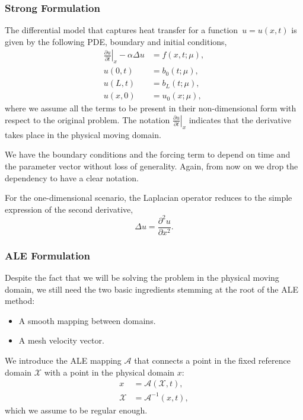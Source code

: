 \documentclass[../../main.tex]{subfiles}
\newcommand{\alemap}{\ensuremath{\mathcal{A}}}
\newcommand{\aleX}{\ensuremath{\mathcal{X}}}
\begin{document}
\subsubsection{Strong Formulation}
The differential model that captures heat transfer for a function~$u = u(x,t)$ is given by the following PDE, boundary and initial conditions,
\begin{subequations}
    \begin{align}
        \left.\frac{\partial u}{\partial t}\right|_{x} - \alpha \Delta u &= f(x, t; \mu), \label{eq:1d_fom_strong_pde}\\
        u(0, t) &= b_0(t; \mu), \\
        u(L, t) &= b_L(t; \mu), \\
        u(x, 0) &= u_0(x; \mu),
    \end{align}
\end{subequations}
where we assume all the terms to be present in their non-dimensional form with respect to the original problem. 
The notation $\left.\frac{\partial u}{\partial t}\right|_{x}$ indicates that the derivative takes place in the physical moving domain. 

We have the boundary conditions and the forcing term to depend on time and the parameter vector without loss of generality.
Again, from now on we drop the dependency to have a clear notation.

For the one-dimensional scenario, the Laplacian operator reduces to the simple expression of the second derivative,
\begin{equation}
    \Delta u = \frac{\partial^2 u}{\partial x^2}.
\end{equation}

\subsubsection{ALE Formulation}
Despite the fact that we will be solving the problem in the physical moving domain, 
we still need the two basic ingredients stemming at the root of the ALE method:
\begin{itemize}
    \item A smooth mapping between domains.
    \item A mesh velocity vector.
\end{itemize}

We introduce the ALE mapping $\alemap$ that connects a point in the fixed reference domain $\mathcal{X}$ with a point in the physical domain $x$:
\begin{subequations}
    \begin{align}
        x &= \alemap(\aleX, t), \\
        \aleX &= \alemap^{-1}(x, t),
    \end{align}
\end{subequations}
which we assume to be regular enough.
\end{document}
